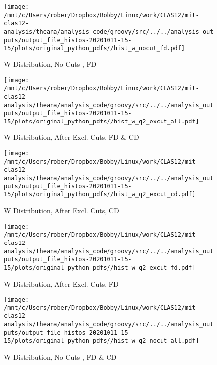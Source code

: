 \documentclass{article}
\begin{document}
\begin{landscape}
    \begin{figure}[h]
        \centering

        \texttt{[image: /mnt/c/Users/rober/Dropbox/Bobby/Linux/work/CLAS12/mit-clas12-analysis/theana/analysis\_code/groovy/src/../../analysis\_outputs/output\_file\_histos-20201011-15-15/plots/original\_python\_pdfs//hist\_w\_nocut\_fd.pdf]}
        \captionsetup{textformat=empty,labelformat=blank}
        \caption{W Distribution, No Cuts , FD}
    \end{figure}
    \clearpage
    
    \begin{figure}[h]
        \centering

        \texttt{[image: /mnt/c/Users/rober/Dropbox/Bobby/Linux/work/CLAS12/mit-clas12-analysis/theana/analysis\_code/groovy/src/../../analysis\_outputs/output\_file\_histos-20201011-15-15/plots/original\_python\_pdfs//hist\_w\_q2\_excut\_all.pdf]}
        \captionsetup{textformat=empty,labelformat=blank}
        \caption{W Distribution, After Excl. Cuts, FD \& CD}
    \end{figure}
    \clearpage
    
    \begin{figure}[h]
        \centering

        \texttt{[image: /mnt/c/Users/rober/Dropbox/Bobby/Linux/work/CLAS12/mit-clas12-analysis/theana/analysis\_code/groovy/src/../../analysis\_outputs/output\_file\_histos-20201011-15-15/plots/original\_python\_pdfs//hist\_w\_q2\_excut\_cd.pdf]}
        \captionsetup{textformat=empty,labelformat=blank}
        \caption{W Distribution, After Excl. Cuts, CD}
    \end{figure}
    \clearpage
    
    \begin{figure}[h]
        \centering

        \texttt{[image: /mnt/c/Users/rober/Dropbox/Bobby/Linux/work/CLAS12/mit-clas12-analysis/theana/analysis\_code/groovy/src/../../analysis\_outputs/output\_file\_histos-20201011-15-15/plots/original\_python\_pdfs//hist\_w\_q2\_excut\_fd.pdf]}
        \captionsetup{textformat=empty,labelformat=blank}
        \caption{W Distribution, After Excl. Cuts, FD}
    \end{figure}
    \clearpage
    
    \begin{figure}[h]
        \centering

        \texttt{[image: /mnt/c/Users/rober/Dropbox/Bobby/Linux/work/CLAS12/mit-clas12-analysis/theana/analysis\_code/groovy/src/../../analysis\_outputs/output\_file\_histos-20201011-15-15/plots/original\_python\_pdfs//hist\_w\_q2\_nocut\_all.pdf]}
        \captionsetup{textformat=empty,labelformat=blank}
        \caption{W Distribution, No Cuts , FD \& CD}
    \end{figure}
    \clearpage
    

\end{landscape}
\end{document}
